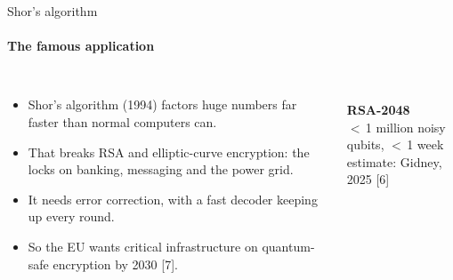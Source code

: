 \documentclass[aspectratio=169,11pt]{beamer}
\newcommand{\hl}[1]{{\color{accent}#1}}
\newcommand{\dimnote}[1]{{\color{dim}\small #1}}
\begin{document}
\begin{frame}{Shor's algorithm}\framesubtitle{The famous application}
  \begin{columns}[c]
    \begin{itemize}\setlength\itemsep{0.7em}
      \item Shor's algorithm (1994) factors huge numbers far faster than normal computers can.
      \item That breaks RSA and elliptic-curve encryption: the locks on banking, messaging and the power grid.
      \item It needs \hl{error correction}, with a fast decoder keeping up every round.
      \item \dimnote{So the EU wants critical infrastructure on quantum-safe encryption by 2030 [7].}
    \end{itemize}
    \centering
    \\[0.6em]
    {\Huge\bfseries RSA-2048}\\[0.3em]
    \hl{$<$\,1 million noisy qubits, $<$\,1 week}\\
    \dimnote{estimate: Gidney, 2025 [6]}
  \end{columns}
\end{frame}
\end{document}
